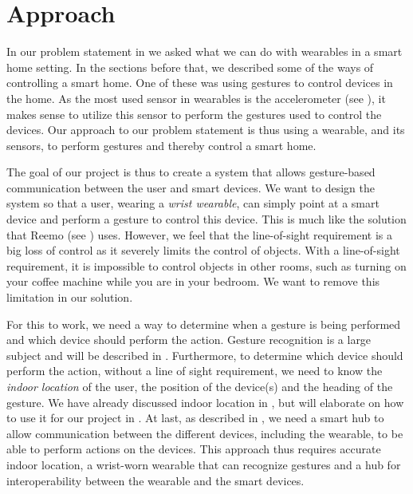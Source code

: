 \section{Approach}\label{sec:approach}
In our problem statement in  we asked what we can do with wearables in a smart home setting.
In the sections before that, we described some of the ways of controlling a smart home. 
One of these was using gestures to control devices in the home. 
As the most used sensor in wearables is the accelerometer (see ), 
it makes sense to utilize this sensor to perform the gestures used to control the devices. 
Our approach to our problem statement is thus using a wearable, 
and its sensors, to perform gestures and thereby control a smart home. 

The goal of our project is thus to create a system that allows gesture-based communication between the user and smart devices.
We want to design the system so that a user, wearing a \emph{wrist wearable}, 
can simply point at a smart device and perform a gesture to control this device. 
This is much like the solution that Reemo (see ) uses. 
However, we feel that the line-of-sight requirement is a big loss of control as it severely limits the control of objects.
With a line-of-sight requirement, it is impossible to control objects in other rooms, 
such as turning on your coffee machine while you are in your bedroom. 
We want to remove this limitation in our solution. 

For this to work, we need a way to determine when a gesture is being performed and which device should perform the action. 
Gesture recognition is a large subject and will be described in . 
Furthermore, to determine which device should perform the action, 
without a line of sight requirement, we need to know the \emph{indoor location} of the user, 
the position of the device(s) and the heading of the gesture. 
We have already discussed indoor location in , 
but will elaborate on how to use it for our project in .
At last, as described in , 
we need a smart hub to allow communication between the different devices, 
including the wearable, to be able to perform actions on the devices. 
This approach thus requires accurate indoor location, a wrist-worn wearable that can recognize gestures and a hub for interoperability between the wearable and the smart devices. 

